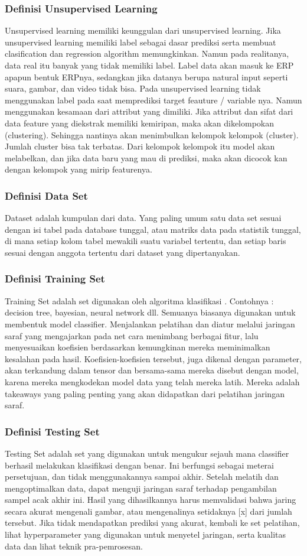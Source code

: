\subsubsection{Definisi Unsupervised Learning}
Unsupervised learning memiliki keunggulan dari unsupervised learning. Jika unsupervised learning memiliki label sebagai dasar prediksi serta membuat clasification dan regression algorithm memungkinkan. Namun pada realitanya, data real itu banyak yang tidak memiliki label. Label data akan masuk ke ERP apapun bentuk ERPnya, sedangkan jika datanya berupa natural input seperti suara, gambar, dan video tidak bisa. Pada unsupervised learning tidak menggunakan label pada saat memprediksi target feauture / variable nya. Namun menggunakan kesamaan dari attribut yang dimiliki. Jika attribut dan sifat dari data feature yang diekstrak memiliki kemiripan, maka akan dikelompokan (clustering). Sehingga nantinya akan menimbulkan kelompok kelompok (cluster). Jumlah cluster bisa tak terbatas. Dari kelompok kelompok itu model akan melabelkan, dan jika data baru yang mau di prediksi, maka akan dicocok kan dengan kelompok yang mirip featurenya.
\subsubsection{Definisi Data Set}
Dataset adalah kumpulan dari data. Yang paling umum satu
data set sesuai dengan isi tabel pada database tunggal, atau matriks data pada statistik tunggal,
di mana setiap kolom tabel mewakili suatu variabel tertentu, dan setiap baris sesuai dengan
anggota tertentu dari dataset yang dipertanyakan.
\subsubsection{Definisi Training Set}
Training Set adalah set digunakan oleh algoritma klasifikasi . Contohnya : decision tree, bayesian, neural network dll. Semuanya biasanya digunakan untuk membentuk model classifier. Menjalankan pelatihan dan diatur melalui jaringan saraf yang mengajarkan pada net cara menimbang berbagai fitur, lalu menyesuaikan koefisien berdasarkan kemungkinan mereka meminimalkan kesalahan pada hasil. Koefisien-koefisien tersebut, juga dikenal dengan parameter, akan terkandung dalam tensor dan bersama-sama mereka disebut dengan model, karena mereka mengkodekan model data yang telah mereka latih. Mereka adalah takeaways yang paling penting yang akan didapatkan dari pelatihan jaringan saraf.
\subsubsection{Definisi Testing Set}
Testing Set adalah set yang digunakan untuk mengukur sejauh mana classifier berhasil
melakukan klasifikasi dengan benar. Ini berfungsi sebagai meterai persetujuan, dan tidak menggunakannya sampai akhir. Setelah melatih dan mengoptimalkan data, dapat menguji jaringan saraf terhadap pengambilan sampel acak akhir ini. Hasil yang dihasilkannya harus memvalidasi bahwa jaring secara akurat mengenali gambar, atau mengenalinya setidaknya [x] dari jumlah tersebut. Jika tidak mendapatkan prediksi yang akurat, kembali ke set pelatihan,
lihat hyperparameter yang digunakan untuk menyetel jaringan, serta kualitas data dan lihat teknik pra-pemrosesan.

